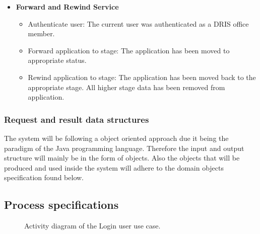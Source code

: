 \documentclass[12pt]{article}
\begin{document}
\begin{itemize}
	\item \textbf{Forward and Rewind Service}
			\begin{itemize}
				\item Authenticate user: The current user was authenticated as a DRIS office member.
				\item Forward application to stage: The application has been moved to appropriate status.
				\item Rewind application to stage: The application has been moved back to the appropriate stage. All higher stage data has been removed from application.							
			\end{itemize}		

\end{itemize}

\subsubsection{Request and result data structures}
The system will be following a object oriented approach due it being the paradigm of the Java programming language. Therefore the input and output structure will mainly be in the form of objects. Also the objects that will be produced and used inside the system will adhere to the domain objects specification found below.

\vspace{0.2in}
\newpage
\subsection{Process specifications}
\vspace{0.2in}

\begin{figure}[H]
\centering	
{}
\caption{Activity diagram of the Login user use case.}
\end{figure}
\end{document}
